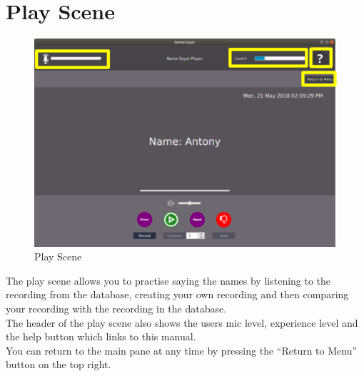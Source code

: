 \documentclass[a4paper,12pt]{article}
\begin{document}
\section{Play Scene}
\begin{figure}[!h]
	\includegraphics[width=\linewidth]{play.png}
	\caption{Play Scene}
\end{figure}
The play scene allows you to practise saying the names by listening to the recording from the database, creating your own recording and then comparing your recording with the recording in the database.
\\


The header of the play scene also shows the users mic level, experience level and the help button which links to this manual.
\\


You can return to the main pane at any time by pressing the “Return to Menu” button on the top right.

\newpage
\end{document}
